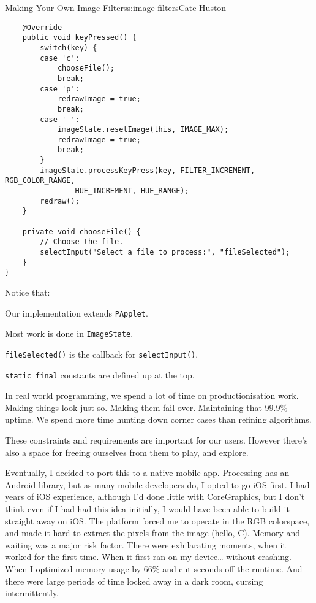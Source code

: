 \begin{aosachapter}{Making Your Own Image Filters}{s:image-filters}{Cate Huston}
\begin{verbatim}
    @Override
    public void keyPressed() {
        switch(key) {
        case 'c':
            chooseFile();
            break;
        case 'p':
            redrawImage = true;
            break;
        case ' ':
            imageState.resetImage(this, IMAGE_MAX);
            redrawImage = true;
            break;
        }
        imageState.processKeyPress(key, FILTER_INCREMENT, RGB_COLOR_RANGE, 
                HUE_INCREMENT, HUE_RANGE);
        redraw();
    }

    private void chooseFile() {
        // Choose the file.
        selectInput("Select a file to process:", "fileSelected");
    }
}
\end{verbatim}

Notice that:

\begin{aosaitemize}

\item
  Our implementation extends \texttt{PApplet}.
\item
  Most work is done in \texttt{ImageState}.
\item
  \texttt{fileSelected()} is the callback for \texttt{selectInput()}.
\item
  \texttt{static final} constants are defined up at the top.
\end{aosaitemize}

\label{the-value-of-prototyping}

In real world programming, we spend a lot of time on productionisation
work. Making things look just so. Making them fail over. Maintaining
that 99.9\% uptime. We spend more time hunting down corner cases than
refining algorithms.

These constraints and requirements are important for our users. However
there's also a space for freeing ourselves from them to play, and
explore.

Eventually, I decided to port this to a native mobile app. Processing
has an Android library, but as many mobile developers do, I opted to go
iOS first. I had years of iOS experience, although I'd done little with
CoreGraphics, but I don't think even if I had had this idea initially, I
would have been able to build it straight away on iOS. The platform
forced me to operate in the RGB colorspace, and made it hard to extract
the pixels from the image (hello, C). Memory and waiting was a major
risk factor. There were exhilarating moments, when it worked for the
first time. When it first ran on my device\ldots{} without crashing.
When I optimized memory usage by 66\% and cut seconds off the runtime.
And there were large periods of time locked away in a dark room, cursing
intermittently.


\end{aosachapter}
